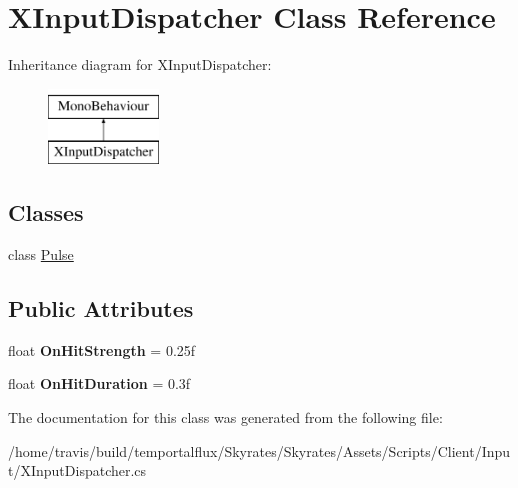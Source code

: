 \hypertarget{class_x_input_dispatcher}{\section{X\-Input\-Dispatcher Class Reference}
\label{class_x_input_dispatcher}
}
Inheritance diagram for X\-Input\-Dispatcher\-:\begin{figure}[H]
\begin{center}
\leavevmode
\includegraphics[height=2.000000cm]{class_x_input_dispatcher}
\end{center}
\end{figure}
\subsection*{Classes}
\begin{DoxyCompactItemize}
\item 
class \hyperlink{class_x_input_dispatcher_1_1_pulse}{Pulse}
\end{DoxyCompactItemize}
\subsection*{Public Attributes}
\begin{DoxyCompactItemize}
\item 
\hypertarget{class_x_input_dispatcher_a2f9f90501d451271a24fb5bf80c39814}{float {\bfseries On\-Hit\-Strength} = 0.\-25f}\label{class_x_input_dispatcher_a2f9f90501d451271a24fb5bf80c39814}

\item 
\hypertarget{class_x_input_dispatcher_ad27791e0f2c26d6825a7be27f8262774}{float {\bfseries On\-Hit\-Duration} = 0.\-3f}\label{class_x_input_dispatcher_ad27791e0f2c26d6825a7be27f8262774}

\end{DoxyCompactItemize}


The documentation for this class was generated from the following file\-:\begin{DoxyCompactItemize}
\item 
/home/travis/build/temportalflux/\-Skyrates/\-Skyrates/\-Assets/\-Scripts/\-Client/\-Input/X\-Input\-Dispatcher.\-cs\end{DoxyCompactItemize}
